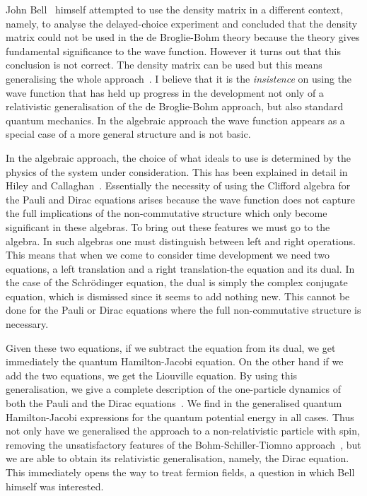 \documentclass[12pt]{article}
\begin{document}
John Bell~\cite{js80} himself attempted to use the density matrix in a different context, namely, to analyse  
the delayed-choice experiment and concluded that the density matrix could not be used in the de Broglie-Bohm theory because the theory gives fundamental significance to the wave function.  However it turns out that this conclusion is not correct.  The density matrix can be used but this means generalising the whole approach~\cite{bh13}.
I believe that it is the {\em insistence} on using the wave function that has held up progress in the development not only of a relativistic generalisation of the de Broglie-Bohm approach, but also standard quantum mechanics.  In the algebraic approach the wave function appears as a special case of a more general structure and is not basic.

In the algebraic approach, the choice of what ideals to use  is determined by the physics of the system under consideration.  This has been explained in detail in Hiley and Callaghan~\cite{bhbc11}.  Essentially the necessity of using the Clifford algebra for  the Pauli and Dirac equations arises because the wave function does not capture the full implications of the non-commutative structure  which only become significant in these algebras. To bring out these features we must go to the algebra.  In such algebras one must distinguish between left and right operations. This means that when we come to consider time development we need two equations, a left translation and a right translation-the equation and its dual.  In the case of the Schr\"{o}dinger equation, the dual is simply the complex conjugate equation, which is dismissed since it seems to  add nothing new.  This cannot be done for the Pauli or Dirac equations where the full non-commutative structure is necessary.

Given these two equations, if we subtract the equation from its dual, we  get immediately the quantum Hamilton-Jacobi equation.  On the other hand if we add the two equations, we get the Liouville equation.  By using this generalisation, we give a complete description of the one-particle dynamics of both the Pauli and the Dirac equations~\cite{bh13}.  We find in the generalised quantum Hamilton-Jacobi expressions for the quantum potential energy in all cases.
 Thus not only have we generalised the approach to a non-relativistic particle with spin, removing the unsatisfactory features of the Bohm-Schiller-Tiomno approach~\cite{bst55}, but we are able to obtain its relativistic generalisation, namely, the Dirac equation.   This immediately opens the way to treat fermion fields, a question in which Bell himself was interested.  
\end{document}
